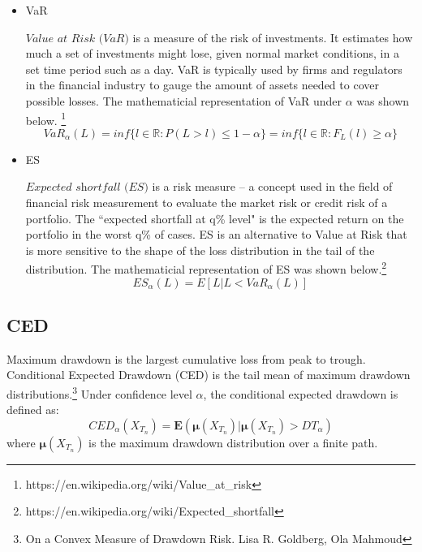 \documentclass[12pt]{article}
\begin{document}
\begin{itemize}
\item VaR

$\textit{Value at Risk (VaR)} $  is a measure of the risk of investments. It estimates how much a set of investments might lose, given normal market conditions, in a set time period such as a day. VaR is typically used by firms and regulators in the financial industry to gauge the amount of assets needed to cover possible losses. The mathematicial representation of VaR under $\alpha$ was shown below. \footnote{https://en.wikipedia.org/wiki/Value\_at\_risk}
\begin{equation}
VaR_{\alpha}(L) = inf\{l \in \mathbb{R} : P(L > l) \leq 1-\alpha \} = 
inf\{l \in \mathbb{R} : F_L(l) \geq \alpha \}
\end{equation}
\item ES

$\textit{Expected shortfall (ES)}$ is a risk measure -- a concept used in the field of financial risk measurement to evaluate the market risk or credit risk of a portfolio. The ``expected shortfall at q\% level" is the expected return on the portfolio in the worst q\% of cases. ES is an alternative to Value at Risk that is more sensitive to the shape of the loss distribution in the tail of the distribution. The mathematicial representation of ES was shown below.\footnote{https://en.wikipedia.org/wiki/Expected\_shortfall}
\begin{equation}
ES_{\alpha}(L) = E\left[ L \vert L<VaR_{\alpha}(L) \right]
\end{equation}

\end{itemize}



\subsection{CED}

Maximum drawdown is the largest cumulative loss from peak to trough. Conditional Expected Drawdown (CED) is the tail mean of maximum drawdown distributions.\footnote{On a Convex Measure of Drawdown Risk. Lisa R. Goldberg, Ola Mahmoud} Under confidence level $\alpha$, the conditional expected drawdown is defined as:
\begin{equation}
CED_\alpha(X_{T_n}) = \textbf{E}(\mathbf{\mu}(X_{T_n})|\mathbf{\mu}(X_{T_n}) > DT_\alpha)
\end{equation}
where $\mathbf{\mu}(X_{T_n})$ is the maximum drawdown distribution over a finite path.
\end{document}
